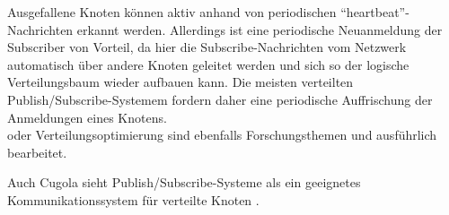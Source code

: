 Ausgefallene Knoten können aktiv anhand von periodischen \enquote{heartbeat}-Nachrichten erkannt werden. Allerdings ist eine periodische Neuanmeldung der Subscriber von Vorteil, da hier die Subscribe-Nachrichten vom Netzwerk automatisch über andere Knoten geleitet werden und sich so der logische Verteilungsbaum wieder aufbauen kann. Die meisten verteilten Publish/Subscribe-Systemem fordern daher eine periodische Auffrischung der Anmeldungen eines Knotens.\\

oder Verteilungsoptimierung \cite{Muhl2002LargeScale} sind ebenfalls Forschungsthemen und ausführlich bearbeitet.

Auch Cugola sieht Publish/Subscribe-Systeme als ein geeignetes Kommunikationssystem für verteilte Knoten \cite{Cugola2002Using}.
